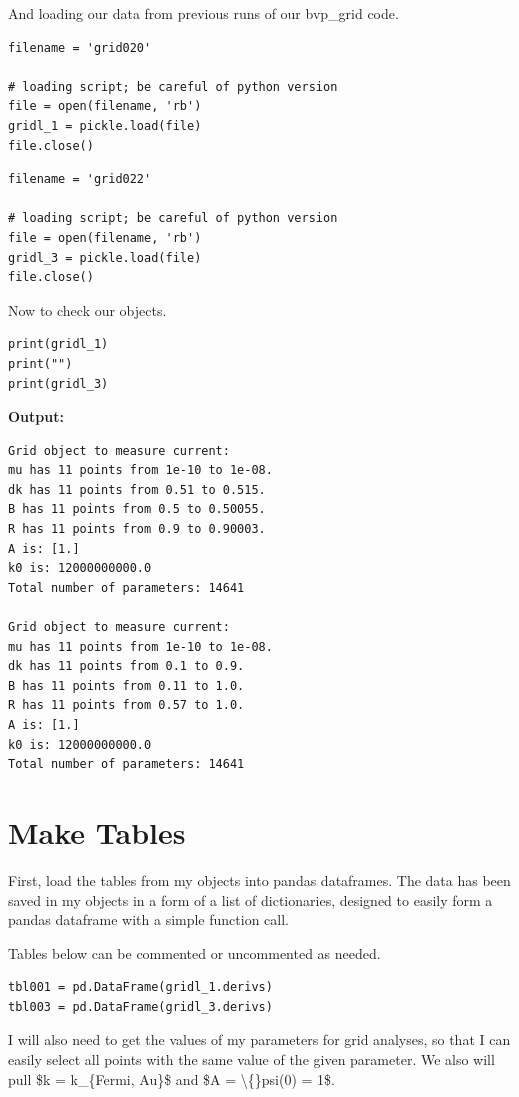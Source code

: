 \documentclass{article}
\begin{document}
And loading our data from previous runs of our bvp\_grid code.

\begin{lstlisting}
filename = 'grid020'

# loading script; be careful of python version
file = open(filename, 'rb')    
gridl_1 = pickle.load(file)
file.close()\end{lstlisting}

\begin{lstlisting}
filename = 'grid022'

# loading script; be careful of python version
file = open(filename, 'rb')    
gridl_3 = pickle.load(file)
file.close()\end{lstlisting}

Now to check our objects.

\begin{lstlisting}
print(gridl_1)
print("")
print(gridl_3)\end{lstlisting}

\textbf{Output:}\begin{verbatim}
Grid object to measure current:
mu has 11 points from 1e-10 to 1e-08.
dk has 11 points from 0.51 to 0.515.
B has 11 points from 0.5 to 0.50055.
R has 11 points from 0.9 to 0.90003.
A is: [1.]
k0 is: 12000000000.0
Total number of parameters: 14641

Grid object to measure current:
mu has 11 points from 1e-10 to 1e-08.
dk has 11 points from 0.1 to 0.9.
B has 11 points from 0.11 to 1.0.
R has 11 points from 0.57 to 1.0.
A is: [1.]
k0 is: 12000000000.0
Total number of parameters: 14641

\end{verbatim}

\section{Make Tables}

First, load the tables from my objects into pandas dataframes. The data has been saved in my objects in a form of a list of dictionaries, designed to easily form a pandas dataframe with a simple function call.

Tables below can be commented or uncommented as needed.

\begin{lstlisting}
tbl001 = pd.DataFrame(gridl_1.derivs)
tbl003 = pd.DataFrame(gridl_3.derivs)\end{lstlisting}

I will also need to get the values of my parameters for grid analyses, so that I can easily select all points with the same value of the given parameter. We also will pull \$k  = k\_\{Fermi, Au\}\$ and \$A = \textbackslash\{\}psi(0) = 1\$.
\end{document}
